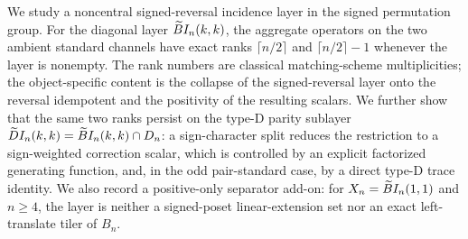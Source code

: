 We study a noncentral signed-reversal incidence layer in the signed permutation group.  For the diagonal layer
$\widetilde{B}I_n(k,k)$, the aggregate operators on the two ambient standard channels have exact ranks
$\lceil n/2\rceil$ and $\lceil n/2\rceil-1$ whenever the layer is nonempty.  The rank numbers are classical
matching-scheme multiplicities; the object-specific content is the collapse of the signed-reversal layer onto the
reversal idempotent and the positivity of the resulting scalars.  We further show that the same two ranks persist on
the type-D parity sublayer $\widetilde{D}I_n(k,k)=\widetilde{B}I_n(k,k)\cap D_n$: a sign-character split reduces the restriction to
a sign-weighted correction scalar, which is controlled by an explicit factorized generating function, and, in the odd
pair-standard case, by a direct type-D trace identity.  We also record a positive-only separator add-on:
for $X_n=\widetilde{B}I_n(1,1)$ and $n\ge4$, the layer is neither a signed-poset linear-extension set nor an exact
left-translate tiler of $B_n$.
